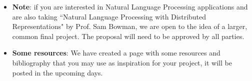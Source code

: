\documentclass[11pt]{article}
\begin{document}
\begin{itemize}
 \item \textbf{Note}: if you are interested in Natural Language Processing applications and are also taking ``Natural Language Processing with Distributed Representations" by Prof. Sam Bowman, we are open to the idea of a larger, common final project. The proposal will need to be approved by all parties. 


\item \textbf{Some resources}: We have created a page with some resources and bibliography that you may use as inspiration for your project, it will be posted in the upcoming days.


\end{itemize}
\end{document}
